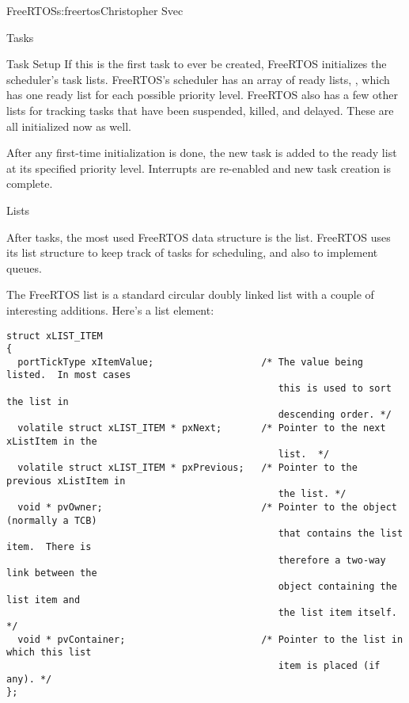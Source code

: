 \begin{aosachapter}{FreeRTOS}{s:freertos}{Christopher Svec}
\begin{aosasect1}{Tasks}
\begin{aosasect2}{Task Setup}
If this is the first task to ever be created, FreeRTOS initializes the
scheduler's task lists. FreeRTOS's scheduler has an array of ready
lists, , which has one ready list for each
possible priority level. FreeRTOS also has a few other lists for
tracking tasks that have been suspended, killed, and delayed. These
are all initialized now as well.

After any first-time initialization is done, the new task is added to
the ready list at its specified priority level.  Interrupts are
re-enabled and new task creation is complete.

\end{aosasect2}

\end{aosasect1}

\begin{aosasect1}{Lists}

After tasks, the most used FreeRTOS data structure is the
list. FreeRTOS uses its list structure to keep track of tasks for
scheduling, and also to implement queues.


The FreeRTOS list is a standard circular doubly linked list with a
couple of interesting additions. Here's a list element:

\begin{verbatim}
struct xLIST_ITEM
{
  portTickType xItemValue;                   /* The value being listed.  In most cases
                                                this is used to sort the list in 
                                                descending order. */
  volatile struct xLIST_ITEM * pxNext;       /* Pointer to the next xListItem in the 
                                                list.  */
  volatile struct xLIST_ITEM * pxPrevious;   /* Pointer to the previous xListItem in 
                                                the list. */
  void * pvOwner;                            /* Pointer to the object (normally a TCB)
                                                that contains the list item.  There is
                                                therefore a two-way link between the 
                                                object containing the list item and 
                                                the list item itself. */
  void * pvContainer;                        /* Pointer to the list in which this list
                                                item is placed (if any). */
};
\end{verbatim}


\end{aosasect1}
\end{aosachapter}
